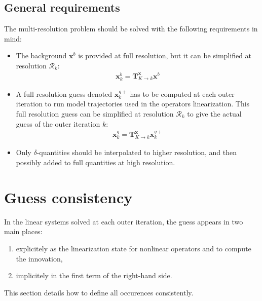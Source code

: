 \documentclass[12pt]{scrartcl}
\begin{document}
\subsection{General requirements}
The multi-resolution problem should be solved with the following requirements in mind:
\begin{itemize}
\item The background $\mathbf{x}^b$ is provided at full resolution, but it can be simplified at resolution $\mathcal{R}_k$:
\begin{align}
\boxed{\mathbf{x}^b_k = \mathbf{T}^\mathbf{x}_{K \rightarrow k} \mathbf{x}^b}
\end{align}
\item A full resolution guess denoted $\mathbf{x}^{g+}_k$ has to be computed at each outer iteration to run model trajectories used in the operators linearization. This full resolution guess can be simplified at resolution $\mathcal{R}_k$ to give the actual guess of the outer iteration $k$:
\begin{align}
\boxed{\mathbf{x}^g_k = \mathbf{T}^\mathbf{x}_{K \rightarrow k} \mathbf{x}^{g+}_k}
\end{align}
\item Only $\delta$-quantities should be interpolated to higher resolution, and then possibly added to full quantities at high resolution.
\end{itemize}

\section{Guess consistency}
In the linear systems solved at each outer iteration, the guess appears in two main places:
\begin{enumerate}
\item explicitely as the linearization state for nonlinear operators and to compute the innovation,
\item implicitely in the first term of the right-hand side.
\end{enumerate}
This section details how to define all occurences consistently.
\end{document}
